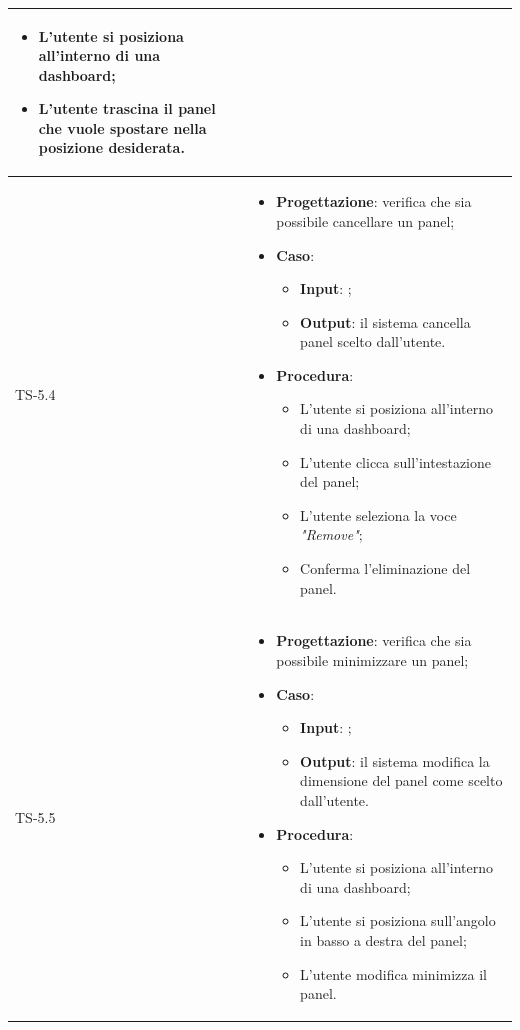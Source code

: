 \begin{longtable}{|C{2.5cm}|C{13cm}|}
\begin{itemize}
	\begin{itemize}
		\item L'utente si posiziona all'interno di una dashboard;
		\item L'utente trascina il panel che vuole spostare nella posizione desiderata.
	\end{itemize} 
\end{itemize}
	 \\
	\hline
	{TS-5.4} & 
\begin{itemize}
	\item \textbf{Progettazione}: verifica che sia possibile cancellare un
	panel;
	\item \textbf{Caso}: 
	\begin{itemize}
		\item \textbf{Input}: ;
		\item \textbf{Output}: il sistema cancella panel scelto dall'utente.
	\end{itemize}
	\item \textbf{Procedura}:
	\begin{itemize}
		\item L'utente si posiziona all'interno di una dashboard;
		\item L'utente clicca sull'intestazione del panel;
		\item L'utente seleziona la voce \emph{"Remove"};
		\item Conferma l'eliminazione del panel.
	\end{itemize} 
\end{itemize}
	 \\
	\hline
	{TS-5.5} & 
\begin{itemize}
	\item \textbf{Progettazione}: verifica che sia possibile minimizzare un
	panel;
	\item \textbf{Caso}: 
	\begin{itemize}
		\item \textbf{Input}: ;
		\item \textbf{Output}: il sistema modifica la dimensione del panel come scelto dall'utente.
	\end{itemize}
	\item \textbf{Procedura}:
	\begin{itemize}
		\item L'utente si posiziona all'interno di una dashboard;
		\item L'utente si posiziona sull'angolo in basso a destra del panel;
		\item L'utente modifica minimizza il panel.

\end{itemize}
\end{itemize}
\end{longtable}
